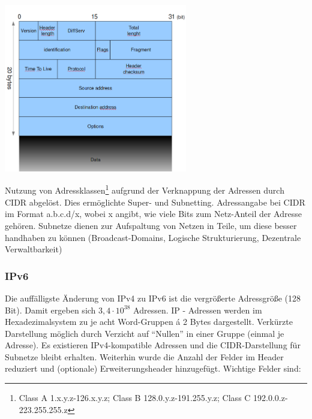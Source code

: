 \documentclass{article} %
\begin{document}
\begin{center}
\includegraphics[width=8cm]{img/IP_packet}
\end{center}

Nutzung von Adressklassen\footnote{Class A 1.x.y.z-126.x.y.z; Class B 128.0.y.z-191.255.y.z; Class C 192.0.0.z-223.255.255.z} aufgrund der Verknappung der Adressen durch CIDR\cite{rfc1519} abgelöst.
Dies ermöglichte Super- und Subnetting.
Adressangabe bei CIDR im Format a.b.c.d/x, wobei x angibt, wie viele Bits zum Netz-Anteil der Adresse gehören.
Subnetze dienen zur Aufspaltung von Netzen in Teile, um diese besser handhaben zu können (Broadcast-Domains, Logische Strukturierung, Dezentrale Verwaltbarkeit)
\subsubsection{IPv6}

Die auffälligste Änderung von IPv4 zu IPv6 ist die vergrößerte Adressgröße (128 Bit).
Damit ergeben sich $3,4 \cdot 10^{38}$ Adressen.
IP - Adressen werden im Hexadezimalsystem zu je acht Word-Gruppen á 2 Bytes dargestellt.
Verkürzte Darstellung möglich durch Verzicht auf "`Nullen"' in einer Gruppe (einmal je Adresse).
Es existieren IPv4-kompatible Adressen und die CIDR-Darstellung für Subnetze bleibt erhalten.
Weiterhin wurde die Anzahl der Felder im Header reduziert und (optionale) Erweiterungsheader hinzugefügt.
Wichtige Felder sind:
\end{document}
